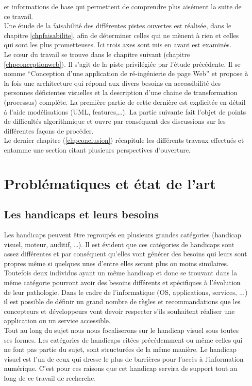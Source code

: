 \documentclass[french,a4paper]{report}
\begin{document}
et informations de base qui permettent de comprendre plus aisément la suite de ce travail.\\
Une étude de la faisabilité des différentes pistes ouvertes est réalisée, dans le chapitre
\ref{chpfaisabilite}, afin de déterminer celles qui ne mènent à rien et celles qui sont
les plus prometteuses. Ici trois axes sont mis en avant est examinés.\\
Le cœur du travail se trouve dans le chapitre suivant (chapitre \ref{chpconceptionweb}).
Il s'agit de la piste privilégiée par l'étude précédente. Il se nomme \enquote{Conception
d'une application de ré-ingénierie de page Web} et propose à la fois une architecture qui
répond aux divers besoins en accessibilité des personnes déficientes visuelles et la
description d'une chaine de transformation (processus) complète. La première partie de cette
dernière est explicitée en détail à l'aide modélisations (UML, features,\dots). La
partie suivante fait l'objet de points de difficultés algorithmique et ouvre par conséquent
des discussions sur les différentes façons de procéder.\\
Le dernier chapitre (\ref{chpconclusion}) récapitule les différents travaux effectués et
entamme une section citant plusieurs perspectives d'ouverture.
\chapter{Problématiques et état de l'art}
\label{chpprobetatart}
\section{Les handicaps et leurs besoins}
Les handicaps peuvent être regroupés en plusieurs grandes catégories (handicap visuel, moteur,
auditif, \dots). Il est évident que ces catégories de handicaps sont assez différentes et par
conséquent qu'elles vont générer des besoins qui leurs sont propres même si quelques unes d'entre
elles seront plus ou moins similaires. Toutefois deux individus ayant un même handicap et
donc se trouvant dans la même catégorie pourront avoir des besoins différents et spécifiques
à l'évolution de leur pathologie.
\newline
Dans le cadre de l'informatique (OS, applications, services, ...) il est possible de définir un
grand nombre de règles et recommandations que les concepteurs et développeurs vont devoir
respecter s’ils souhaitent réaliser une application ou un service accessible.\\
Tout au long du sujet nous nous focaliserons sur le handicap visuel sous toutes ses formes.
Les catégories de handicaps citées précédemment ou même celles qui ne font pas partie du sujet,
sont structurées de la même manière. Le handicap visuel est l'un de ceux qui dresse le plus de
barrières pour l'accès à l'information numérique. C'est pour ces raisons que cet handicap
servira de support tout au long de ce travail de recherche.
\end{document}
